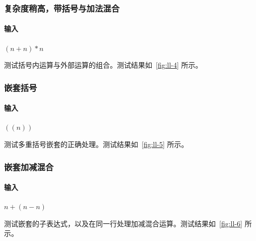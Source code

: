 \subsubsection{复杂度稍高，带括号与加法混合}
\paragraph{输入} $(n+n)*n$

测试括号内运算与外部运算的组合。测试结果如~\autoref{fig:ll-4} 所示。

\subsubsection{嵌套括号}
\paragraph{输入} $((n))$

测试多重括号嵌套的正确处理。测试结果如~\autoref{fig:ll-5} 所示。

\subsubsection{嵌套加减混合}
\paragraph{输入} $n+(n-n)$

测试嵌套的子表达式，以及在同一行处理加减混合运算。测试结果如~\autoref{fig:ll-6} 所示。

